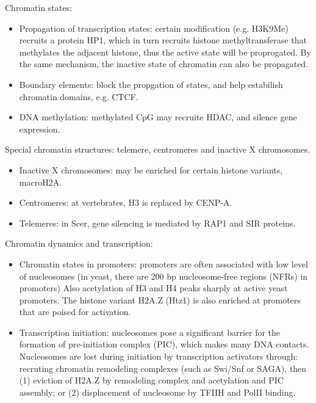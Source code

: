 \documentclass{report}
\begin{document}
Chromatin states:
\begin{itemize}
	\item Propagation of transcription states: certain modification (e.g. H3K9Me) recruits a protein HP1, which in turn recruits histone methyltransferase that methylates the adjacent histone, thus the active state will be proprogated. By the same mechanism, the inactive state of chromatin can also be propagated. 
	\item Boundary elements: block the propgation of states, and help estabilish chromatin domains, e.g. CTCF. 
	\item DNA methylation: methylated CpG may recruite HDAC, and silence gene expression. 
\end{itemize}

Special chromatin structures: telemere, centromeres and inactive X chromosomes. 
\begin{itemize}
	\item Inactive X chromosomes: may be enriched for certain histone variants, macroH2A. 
	\item Centromeres: at vertebrates, H3 is replaced by CENP-A. 
	\item Telemeres: in Scer, gene silencing is mediated by RAP1 and SIR proteins. 
\end{itemize}

Chromatin dynamics and transcription: 
\begin{itemize}
	\item Chromatin states in promoters: promoters are often associated with low level of nucleosomes (in yeast, there are 200 bp nucleosome-free regions (NFRs) in promoters) Also acetylation of H3 and H4 peaks sharply at active yeast promoters. The histone variant H2A.Z (Htz1) is also enriched at promoters that are poised for activation. 
	\item Transcription initiation: nucleosomes pose a significant barrier for the formation of pre-initiation complex (PIC), which makes many DNA contacts. Nucleosomes are lost during initiation by transcription activators through: recruting chromatin remodeling complexes (such as Swi/Snf or SAGA), then (1) eviction of H2A.Z by remodeling complex and acetylation and PIC assembly; or (2) displacement of nucleosome by TFIIH and PolII binding. 
\end{itemize}
\end{document}
